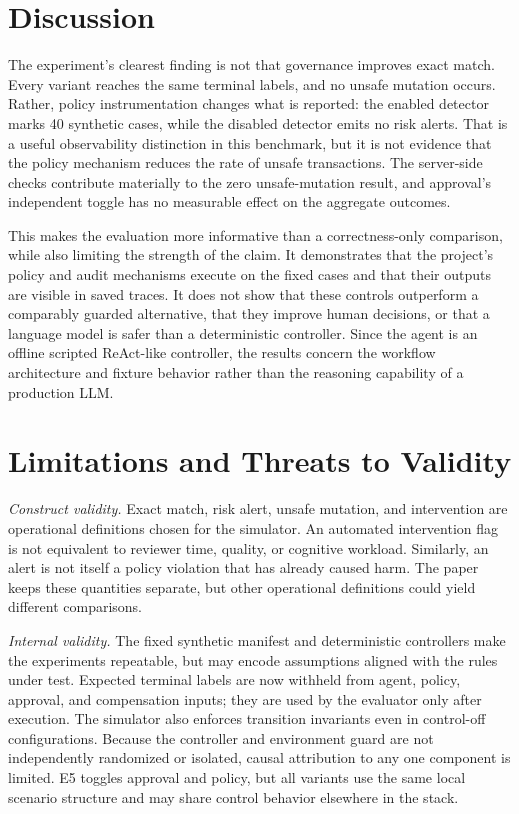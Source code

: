 \documentclass[conference]{IEEEtran}
\begin{document}
\section{Discussion}

The experiment's clearest finding is not that governance improves exact match. Every variant reaches the same terminal labels, and no unsafe mutation occurs. Rather, policy instrumentation changes what is reported: the enabled detector marks 40 synthetic cases, while the disabled detector emits no risk alerts. That is a useful observability distinction in this benchmark, but it is not evidence that the policy mechanism reduces the rate of unsafe transactions. The server-side checks contribute materially to the zero unsafe-mutation result, and approval's independent toggle has no measurable effect on the aggregate outcomes.

This makes the evaluation more informative than a correctness-only comparison, while also limiting the strength of the claim. It demonstrates that the project's policy and audit mechanisms execute on the fixed cases and that their outputs are visible in saved traces. It does not show that these controls outperform a comparably guarded alternative, that they improve human decisions, or that a language model is safer than a deterministic controller. Since the agent is an offline scripted ReAct-like controller, the results concern the workflow architecture and fixture behavior rather than the reasoning capability of a production LLM.

\section{Limitations and Threats to Validity}

\textit{Construct validity.} Exact match, risk alert, unsafe mutation, and intervention are operational definitions chosen for the simulator. An automated intervention flag is not equivalent to reviewer time, quality, or cognitive workload. Similarly, an alert is not itself a policy violation that has already caused harm. The paper keeps these quantities separate, but other operational definitions could yield different comparisons.

\textit{Internal validity.} The fixed synthetic manifest and deterministic controllers make the experiments repeatable, but may encode assumptions aligned with the rules under test. Expected terminal labels are now withheld from agent, policy, approval, and compensation inputs; they are used by the evaluator only after execution. The simulator also enforces transition invariants even in control-off configurations. Because the controller and environment guard are not independently randomized or isolated, causal attribution to any one component is limited. E5 toggles approval and policy, but all variants use the same local scenario structure and may share control behavior elsewhere in the stack.
\end{document}
